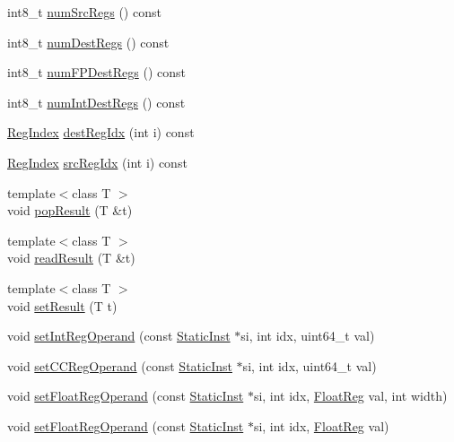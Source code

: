 \begin{DoxyCompactItemize}
\item 
int8\_\-t \hyperlink{classBaseDynInst_a3902ecc708a6f28e94ee9aa975692915}{numSrcRegs} () const 
\item 
int8\_\-t \hyperlink{classBaseDynInst_ab7e23352b3d45a982dfeb799030f87d0}{numDestRegs} () const 
\item 
int8\_\-t \hyperlink{classBaseDynInst_a7ec0ad00d322ae83bc5fae443ef04323}{numFPDestRegs} () const 
\item 
int8\_\-t \hyperlink{classBaseDynInst_a3935410f8201e0afd0f8e459f838b463}{numIntDestRegs} () const 
\item 
\hyperlink{classBaseDynInst_a36d25e03e43fa3bb4c5482cbefe5e0fb}{RegIndex} \hyperlink{classBaseDynInst_ae5a1a6d72f40f715253b91e32b3caad2}{destRegIdx} (int i) const 
\item 
\hyperlink{classBaseDynInst_a36d25e03e43fa3bb4c5482cbefe5e0fb}{RegIndex} \hyperlink{classBaseDynInst_a9353aea3dfe673b88a4a96163d58759f}{srcRegIdx} (int i) const 
\item 
{\footnotesize template$<$class T $>$ }\\void \hyperlink{classBaseDynInst_a8d4a144e868da0550434bd5ec9969982}{popResult} (T \&t)
\item 
{\footnotesize template$<$class T $>$ }\\void \hyperlink{classBaseDynInst_a87e2b2758379a95a212458692938e787}{readResult} (T \&t)
\item 
{\footnotesize template$<$class T $>$ }\\void \hyperlink{classBaseDynInst_accfdfc918ee73975e86b08cf8a528479}{setResult} (T t)
\item 
void \hyperlink{classBaseDynInst_a654e99f2be7cd298378462ce9651bb44}{setIntRegOperand} (const \hyperlink{classStaticInst}{StaticInst} $\ast$si, int idx, uint64\_\-t val)
\item 
void \hyperlink{classBaseDynInst_afeb2b876cf6b29215cf9d6d56ba8863b}{setCCRegOperand} (const \hyperlink{classStaticInst}{StaticInst} $\ast$si, int idx, uint64\_\-t val)
\item 
void \hyperlink{classBaseDynInst_a2cce6f570bd24e9b78535c5f3bf3746f}{setFloatRegOperand} (const \hyperlink{classStaticInst}{StaticInst} $\ast$si, int idx, \hyperlink{classBaseDynInst_a75484259f1855aabc8d74c6eb1cfe186}{FloatReg} val, int width)
\item 
void \hyperlink{classBaseDynInst_addc8b4b6511725bf8ff48bd09ef22892}{setFloatRegOperand} (const \hyperlink{classStaticInst}{StaticInst} $\ast$si, int idx, \hyperlink{classBaseDynInst_a75484259f1855aabc8d74c6eb1cfe186}{FloatReg} val)

\end{DoxyCompactItemize}
